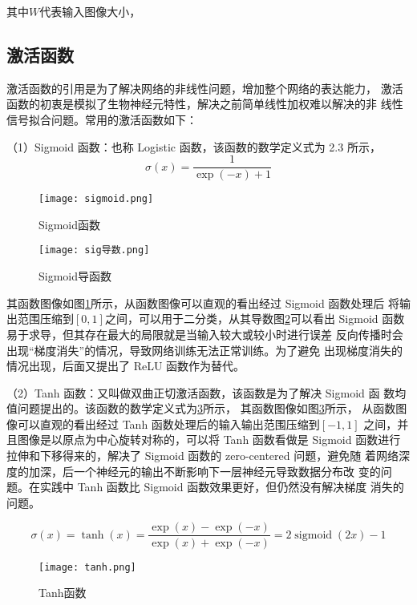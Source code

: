 其中$W$代表输入图像大小，

\subsection{激活函数}
激活函数的引用是为了解决网络的非线性问题，增加整个网络的表达能力，
激活函数的初衷是模拟了生物神经元特性，解决之前简单线性加权难以解决的非
线性信号拟合问题。常用的激活函数如下：

（1）Sigmoid 函数：也称 Logistic 函数，该函数的数学定义式为 2.3 所示，
\begin{equation}
    \sigma(x)=\frac{1}{\exp (-x)+1}
\end{equation}

\begin{figure}[htbp]
    \centering
    \texttt{[image: sigmoid.png]}
    \caption{Sigmoid函数}
    \label{sig}
\end{figure}

\begin{figure}[htbp]
    \centering
    \texttt{[image: sig导数.png]}
    \caption{Sigmoid导函数}
    \label{sigd}
\end{figure}

其函数图像如图\ref{sig}所示，从函数图像可以直观的看出经过 Sigmoid 函数处理后
将输出范围压缩到$[0,1]$之间，可以用于二分类，从其导数图\ref{sigd}可以看出
Sigmoid 函数易于求导，但其存在最大的局限就是当输入较大或较小时进行误差
反向传播时会出现“梯度消失”的情况，导致网络训练无法正常训练。为了避免
出现梯度消失的情况出现，后面又提出了 ReLU 函数作为替代。

（2）Tanh 函数：又叫做双曲正切激活函数，该函数是为了解决 Sigmoid 函
数均值问题提出的。该函数的数学定义式为\ref{tanh}所示，
其函数图像如图\ref{tanh}所示，
从函数图像可以直观的看出经过 Tanh 函数处理后的输入输出范围压缩到$[-1,1]$
之间，并且图像是以原点为中心旋转对称的，可以将 Tanh 函数看做是 Sigmoid
函数进行拉伸和下移得来的，解决了 Sigmoid 函数的 zero-centered 问题，避免随
着网络深度的加深，后一个神经元的输出不断影响下一层神经元导致数据分布改
变的问题。在实践中 Tanh 函数比 Sigmoid 函数效果更好，但仍然没有解决梯度
消失的问题。

\begin{equation}
    \sigma(x)=\tanh (x)=\frac{\exp (x)-\exp (-x)}{\exp (x)+\exp (-x)}=2 \operatorname{sigmoid}(2 x)-1
    \label{tan}
\end{equation}

\begin{figure}[htbp]
    \centering
    \texttt{[image: tanh.png]}
    \caption{Tanh函数}
    \label{tanh}
\end{figure}

